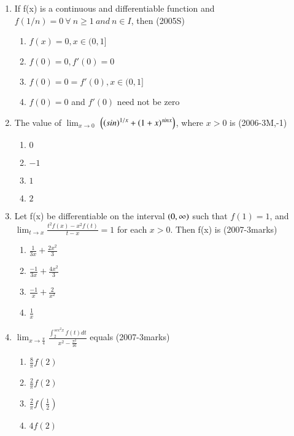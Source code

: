 \documentclass[journal,12pt,twocolumn]{IEEEtran}
\theoremstyle{remark}
\begin{document}
\begin{enumerate}
\item %

If f(x) is a continuous and differentiable function and $f(1/n)=0\ \forall\ n\geq1\ and\ n\in I$, then   \hfill{(2005S)}
    \begin{enumerate}
     \item $f(x)=0,x\in(0,1]$
     \item $f(0)=0,f'(0)=0$
     \item $f(0)=0=f'(0), x\in(0,1]$
     \item $f(0)=0$ and $f'(0)$ need not be zero\\
    \end{enumerate}


\item %

	The value of $\lim_{x \to 0}$ $\left( \left(sin\right)^{1/x} + \left(1+x\right)^{sinx}\right)$, where $x > 0$ is \hfill{(2006-3M,-1)}
    \begin{enumerate}
     \item $0$
     \item $-1$
     \item $1$
     \item $2$\\
    \end{enumerate}


\item %

	Let f(x) be differentiable on the interval $\left(0,\infty\right)$ such that $f(1)=1$, and $\lim_{t \to x} \frac{t^2f(x)-x^2f(t)}{t-x}=1$ for each $x>0$. Then f(x) is \hfill{(2007-3marks)}
    \begin{enumerate}
     \item $\frac{1}{3x}+\frac{2x^2}{3}$\\
     \item $\frac{-1}{3x}+\frac{4x^2}{3}$\\
     \item $\frac{-1}{x}+\frac{2}{x^2}$\\
     \item $\frac{1}{x}$\\
    \end{enumerate}


\item %

$\lim_{x \to \frac{\pi}{4}}$$ \displaystyle \frac{\int_2^{sec^2x} f(t) dt}{x^2-\frac{\pi^2}{16}}$ equals \hfill{(2007-3marks)}
    \begin{enumerate}
     \item $\frac{8}{\pi}f(2)$
     \item $\frac{2}{\pi}f(2)$
     \item $\frac{2}{\pi}f(\frac{1}{2})$
     \item $4f(2)$\\
    \end{enumerate}


\end{enumerate}
\end{document}
